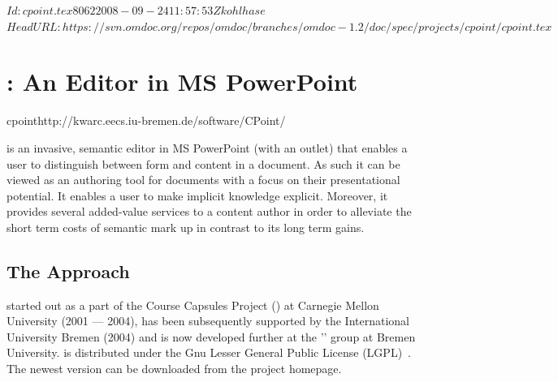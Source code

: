 \svnInfo $Id: cpoint.tex 8062 2008-09-24 11:57:53Z kohlhase $
\svnKeyword $HeadURL: https://svn.omdoc.org/repos/omdoc/branches/omdoc-1.2/doc/spec/projects/cpoint/cpoint.tex $

\section[CPoint]{{\cpoint}: An {\omdoc} Editor in MS PowerPoint}
\def\cpauthor{\scsys{CPointAuthor}}
\def\cpstudent{\scsys{CPointStudent}}
\def\cpbasic{\scsys{CPointBasic}}
\def\cpgraphs{\scsys{CPointGraphs}}
\def\cpimport{\scsys{CPointImport}}
\def\cpnotes{\scsys{CPointNotes}}
\def\texpoint{\scsys{TexPoint}}

\begin{project}{cpoint}{http://kwarc.eecs.iu-bremen.de/software/CPoint/}
\end{project}

{\cpoint} is an invasive, semantic {\omdoc} editor in MS PowerPoint (with an {\omdoc}
outlet) that enables a user to distinguish between form and content in a document. As such
it can be viewed as an authoring tool for {\omdoc} documents with a focus on their
presentational potential. It enables a user to make implicit knowledge explicit. Moreover,
it provides several added-value services to a content author in order to alleviate the
short term costs of semantic mark up in contrast to its long term gains.

\subsection{The {\cpoint} Approach}\label{sec:background}
{\cpoint} started out as a part of the Course Capsules Project
({\ccaps}) at Carnegie Mellon University (2001 --- 2004), has been subsequently supported by the
International University Bremen (2004) and is now developed further at the '{}' group at Bremen University. {\cpoint} is distributed under
the Gnu Lesser General Public License (LGPL)~\cite{LGPL}.  The newest version can be
downloaded from the project homepage.

